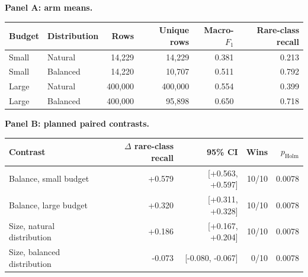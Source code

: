 \begin{minipage}{\linewidth}
\centering
\textbf{Panel A: arm means.}\\[3pt]
\begin{tabular}{@{}llrrrr@{}}
\toprule
Budget & Distribution & Rows & Unique rows & Macro-$F_1$ & Rare-class recall \\
\midrule
Small & Natural & 14,229 & 14,229 & 0.381 & 0.213 \\
Small & Balanced & 14,220 & 10,707 & 0.511 & 0.792 \\
Large & Natural & 400,000 & 400,000 & 0.554 & 0.399 \\
Large & Balanced & 400,000 & 95,898 & 0.650 & 0.718 \\
\bottomrule
\end{tabular}
\par\medskip
\textbf{Panel B: planned paired contrasts.}\\[3pt]
\begin{tabular}{@{}lrrrr@{}}
\toprule
Contrast & $\Delta$ rare-class recall & 95\% CI & Wins & $p_{\mathrm{Holm}}$ \\
\midrule
Balance, small budget & +0.579 & [+0.563, +0.597] & 10/10 & 0.0078 \\
Balance, large budget & +0.320 & [+0.311, +0.328] & 10/10 & 0.0078 \\
Size, natural distribution & +0.186 & [+0.167, +0.204] & 10/10 & 0.0078 \\
Size, balanced distribution & -0.073 & [-0.080, -0.067] & 0/10 & 0.0078 \\
\bottomrule
\end{tabular}
\end{minipage}
